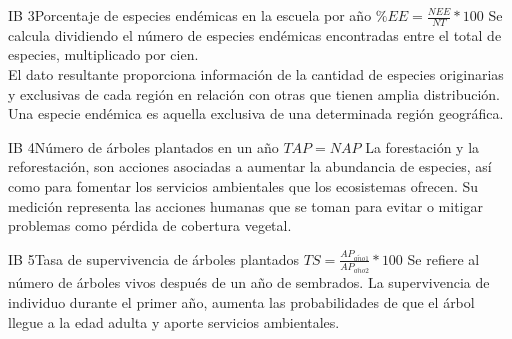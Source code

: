 \begin{indicador}{IB 3}{Porcentaje de especies endémicas en la escuela por año}
	{$\%EE = \frac{NEE}{NT} * 100$} %
	{
		Se calcula dividiendo el número de especies endémicas encontradas entre el total de especies, multiplicado por cien. \\
		
		El dato resultante proporciona información de la cantidad de especies originarias y exclusivas de cada región en relación con otras que tienen amplia distribución. 
		Una especie endémica es aquella exclusiva de una determinada región geográfica.
	} 	
\end{indicador}
\begin{indicador}{IB 4}{Número de árboles plantados en un año}
	{$TAP = NAP$}
	{
		La forestación y la reforestación, son acciones asociadas a aumentar la abundancia de especies, así como para fomentar los servicios ambientales que los ecosistemas ofrecen. 
		Su medición representa las acciones humanas que se toman para evitar o mitigar problemas como pérdida de cobertura vegetal. 
	} 	
\end{indicador}
\begin{indicador}{IB 5}{Tasa de supervivencia de árboles plantados}
	{$TS = \frac{AP_{a\tilde{n}o1}}{AP_{a\tilde{n}o2}} * 100$}%
	{
		Se refiere al número de árboles vivos después de un año de sembrados. La supervivencia de individuo durante el primer año, aumenta las probabilidades de que el árbol llegue a la edad adulta y aporte servicios ambientales.
	} 	
\end{indicador}
